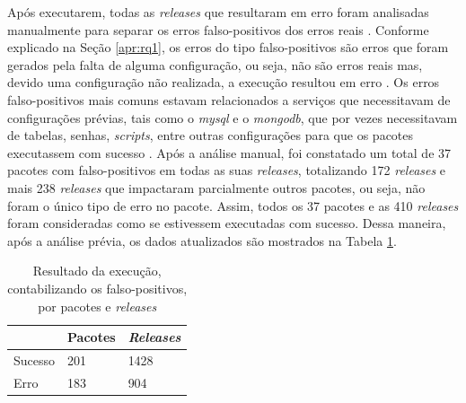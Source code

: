 Após executarem, todas as \textit{releases}  que resultaram em erro foram analisadas manualmente para separar os erros falso-positivos dos erros reais . Conforme explicado na Seção \ref{apr:rq1}, os erros do tipo falso-positivos são erros que foram gerados pela falta de alguma configuração, ou seja, não são erros reais mas, devido uma configuração não realizada, a execução resultou em erro . Os erros falso-positivos mais comuns estavam relacionados a serviços que necessitavam de configurações prévias, tais como o \textit{mysql} e o \textit{mongodb}, que por vezes necessitavam de tabelas, senhas, \textit{scripts}, entre outras configurações para que os pacotes executassem com sucesso . Após a análise manual, foi constatado um total de 37 pacotes com falso-positivos em todas as suas \textit{releases}, totalizando 172 \textit{releases} e mais 238 \textit{releases} que impactaram parcialmente outros pacotes, ou seja, não foram o único tipo de erro no pacote. Assim, todos os 37 pacotes e as 410 \textit{releases} foram consideradas como se estivessem executadas com sucesso. Dessa maneira, após a análise prévia, os dados atualizados são mostrados na Tabela \ref{tab:res_rq1_2}.

\begin{table}[]
\centering
\begin{tabular}{|l|l|l|}
\hline
                    & Pacotes & \textit{Releases} \\ \hline
    Sucesso         & 201     & 1428     \\
    Erro            & 183     & 904     \\ \hline
\end{tabular}
\caption{Resultado da execução, contabilizando os falso-positivos, por pacotes e \textit{releases}}
\label{tab:res_rq1_2}
\end{table}


